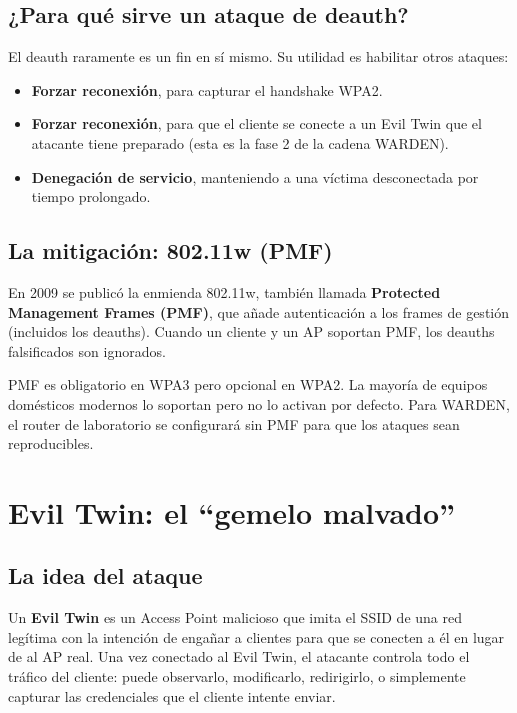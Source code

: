 \documentclass[11pt,a4paper]{article}
\begin{document}
\subsection{¿Para qué sirve un ataque de deauth?}
El deauth raramente es un fin en sí mismo. Su utilidad es habilitar otros
ataques:

\begin{itemize}
  \item \textbf{Forzar reconexión}, para capturar el handshake WPA2.
  \item \textbf{Forzar reconexión}, para que el cliente se conecte a un
    Evil Twin que el atacante tiene preparado (esta es la fase 2 de la
    cadena WARDEN).
  \item \textbf{Denegación de servicio}, manteniendo a una víctima
    desconectada por tiempo prolongado.
\end{itemize}

\subsection{La mitigación: 802.11w (PMF)}
En 2009 se publicó la enmienda 802.11w, también llamada \textbf{Protected
Management Frames (PMF)}, que añade autenticación a los frames de gestión
(incluidos los deauths). Cuando un cliente y un AP soportan PMF, los
deauths falsificados son ignorados.

PMF es obligatorio en WPA3 pero opcional en WPA2. La mayoría de equipos
domésticos modernos lo soportan pero no lo activan por defecto. Para
WARDEN, el router de laboratorio se configurará sin PMF para que los
ataques sean reproducibles.

\section{Evil Twin: el ``gemelo malvado''}

\subsection{La idea del ataque}
Un \textbf{Evil Twin} es un Access Point malicioso que imita el SSID de
una red legítima con la intención de engañar a clientes para que se
conecten a él en lugar de al AP real. Una vez conectado al Evil Twin, el
atacante controla todo el tráfico del cliente: puede observarlo,
modificarlo, redirigirlo, o simplemente capturar las credenciales que el
cliente intente enviar.
\end{document}
